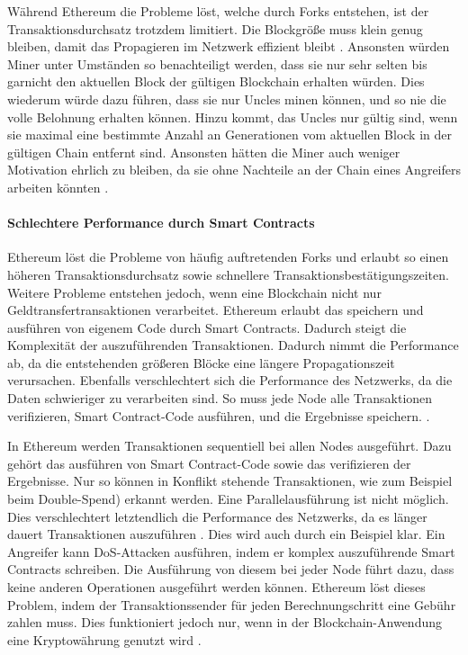 Während Ethereum die Probleme löst, welche durch Forks entstehen, ist der Transaktionsdurchsatz trotzdem limitiert. Die Blockgröße muss klein genug bleiben, damit das Propagieren im Netzwerk effizient bleibt \cite{SchererPerformanceScalabilityBlockchain2017}. Ansonsten würden Miner unter Umständen so benachteiligt werden, dass sie nur sehr selten bis garnicht den aktuellen Block der gültigen Blockchain erhalten würden. Dies wiederum würde dazu führen, dass sie nur Uncles minen können, und so nie die volle Belohnung erhalten können. Hinzu kommt, das Uncles nur gültig sind, wenn sie maximal eine bestimmte Anzahl an Generationen vom aktuellen Block in der gültigen Chain entfernt sind. Ansonsten hätten die Miner auch weniger Motivation ehrlich zu bleiben, da sie ohne Nachteile an der Chain eines Angreifers arbeiten könnten \cite{EthereumTeamEthereumWhitePaper2017}.

\paragraph{Schlechtere Performance durch Smart Contracts}
Ethereum löst die Probleme von häufig auftretenden Forks und erlaubt so einen höheren Transaktionsdurchsatz sowie schnellere Transaktionsbestätigungszeiten. Weitere Probleme entstehen jedoch, wenn eine Blockchain nicht nur Geldtransfertransaktionen verarbeitet. Ethereum erlaubt das speichern und ausführen von eigenem Code durch Smart Contracts. Dadurch steigt die Komplexität der auszuführenden Transaktionen. Dadurch nimmt die Performance ab, da die entstehenden größeren Blöcke eine längere Propagationszeit verursachen. Ebenfalls verschlechtert sich die Performance des Netzwerks, da die Daten schwieriger zu verarbeiten sind. So muss jede Node alle Transaktionen verifizieren, Smart Contract-Code ausführen, und die Ergebnisse speichern. \cite{SchererPerformanceScalabilityBlockchain2017}. 

In Ethereum werden Transaktionen sequentiell bei allen Nodes ausgeführt. Dazu gehört das ausführen von Smart Contract-Code sowie das verifizieren der Ergebnisse. Nur so können in Konflikt stehende Transaktionen, wie zum Beispiel beim Double-Spend) erkannt werden. Eine Parallelausführung ist nicht möglich. Dies verschlechtert letztendlich die Performance des Netzwerks, da es länger dauert Transaktionen auszuführen \cite{SchererPerformanceScalabilityBlockchain2017}. Dies wird auch durch ein Beispiel klar. Ein Angreifer kann DoS-Attacken ausführen, indem er komplex auszuführende Smart Contracts schreiben. Die Ausführung von diesem bei jeder Node führt dazu, dass keine anderen Operationen ausgeführt werden können. Ethereum löst dieses Problem, indem der Transaktionssender für jeden Berechnungschritt eine Gebühr zahlen muss. Dies funktioniert jedoch nur, wenn in der Blockchain-Anwendung eine Kryptowährung genutzt wird \cite{VukolicRethinkingPermissionedBlockchains2017}. 

